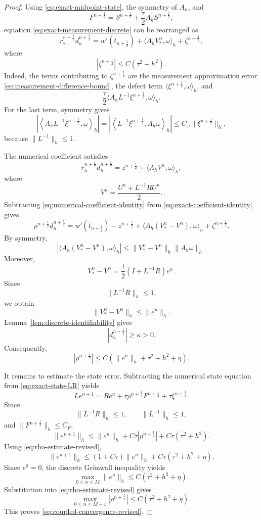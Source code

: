 \documentclass[reqno]{amsart}
\begin{document}
\begin{proof}
Using \eqref{eq:exact-midpoint-state},
the symmetry of \(A_h\), and
\[
F^{n+\frac12}
=
S^{n+\frac12}
+
\frac{\tau}{2}A_hS^{n+\frac12},
\]
equation \eqref{eq:exact-measurement-discrete} can be rearranged as
\begin{equation}
r_*^{n+\frac12}
d_h^{n+\frac12}
=
w'(t_{n+\frac12})
+
\langle A_hV_*^n,\omega\rangle_h
+
\zeta^{n+\frac12},
\label{eq:exact-coefficient-identity}
\end{equation}
where
\begin{equation}
|\zeta^{n+\frac12}|
\le
C(\tau^2+h^2).
\label{eq:zeta-bound}
\end{equation}
Indeed, the terms contributing to \(\zeta^{n+\frac12}\) are
the measurement approximation error
\eqref{eq:measurement-difference-bound},
the defect term
\(\langle\xi^{n+\frac12},\omega\rangle_h\),
and
\[
\frac{\tau}{2}
\langle
A_hL^{-1}\xi^{n+\frac12},
\omega
\rangle_h.
\]
For the last term, symmetry gives
\[
\left|
\left\langle
A_hL^{-1}\xi^{n+\frac12},
\omega
\right\rangle_h
\right|
=
\left|
\left\langle
L^{-1}\xi^{n+\frac12},
A_h\omega
\right\rangle_h
\right|
\le
C_\omega
\|\xi^{n+\frac12}\|_h,
\]
because \(\|L^{-1}\|_h\le1\).

The numerical coefficient satisfies
\begin{equation}
r_h^{n+\frac12}
d_h^{n+\frac12}
=
z^{n+\frac12}
+
\langle A_hV^n,\omega\rangle_h,
\label{eq:numerical-coefficient-identity}
\end{equation}
where
\[
V^n
=
\frac{U^n+L^{-1}RU^n}{2}.
\]
Subtracting
\eqref{eq:numerical-coefficient-identity}
from \eqref{eq:exact-coefficient-identity} gives
\[
\rho^{n+\frac12}d_h^{n+\frac12}
=
w'(t_{n+\frac12})-z^{n+\frac12}
+
\langle A_h(V_*^n-V^n),\omega\rangle_h
+
\zeta^{n+\frac12}.
\]
By symmetry,
\[
\left|
\langle A_h(V_*^n-V^n),\omega\rangle_h
\right|
\le
\|V_*^n-V^n\|_h
\|A_h\omega\|_h.
\]
Moreover,
\[
V_*^n-V^n
=
\frac12
\left(
I+L^{-1}R
\right)e^n.
\]
Since
\[
\|L^{-1}R\|_h\le1,
\]
we obtain
\[
\|V_*^n-V^n\|_h
\le
\|e^n\|_h.
\]
Lemma~\ref{lem:discrete-identifiability} gives
\[
|d_h^{n+\frac12}|
\ge\kappa>0.
\]
Consequently,
\begin{equation}
|\rho^{n+\frac12}|
\le
C\left(
\|e^n\|_h
+
\tau^2+h^2+\eta
\right).
\label{eq:rho-estimate-revised}
\end{equation}

It remains to estimate the state error. Subtracting the numerical
state equation from \eqref{eq:exact-state-LR} yields
\[
Le^{n+1}
=
Re^n
+
\tau\rho^{n+\frac12}F^{n+\frac12}
+
\tau\xi^{n+\frac12}.
\]
Since
\[
\|L^{-1}R\|_h\le1,
\qquad
\|L^{-1}\|_h\le1,
\]
and \(\|F^{n+\frac12}\|_h\le C_F\),
\[
\|e^{n+1}\|_h
\le
\|e^n\|_h
+
C\tau|\rho^{n+\frac12}|
+
C\tau(\tau^2+h^2).
\]
Using \eqref{eq:rho-estimate-revised},
\[
\|e^{n+1}\|_h
\le
(1+C\tau)\|e^n\|_h
+
C\tau(\tau^2+h^2+\eta).
\]
Since \(e^0=0\), the discrete Gr\"onwall inequality yields
\[
\max_{0\le n\le M}\|e^n\|_h
\le
C(\tau^2+h^2+\eta).
\]
Substitution into \eqref{eq:rho-estimate-revised} gives
\[
\max_{0\le n\le M-1}
|\rho^{n+\frac12}|
\le
C(\tau^2+h^2+\eta).
\]
This proves \eqref{eq:coupled-convergence-revised}.
\end{proof}
\end{document}
